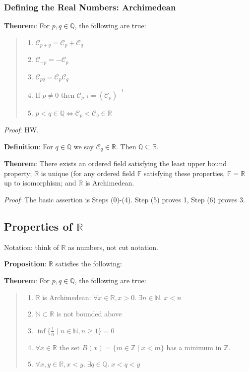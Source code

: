 \documentclass[11pt]{article}
\begin{document}
\subsubsection{Defining the Real Numbers: Archimedean}

\textbf{Theorem}: For $p,q \in \mathbb{Q}$, the following are true:
\begin{quote}\vspace{-0.3cm}
	\begin{enumerate}
	\item $\mathcal{C}_{p+q} = \mathcal{C}_p + \mathcal{C}_q$
	\item $\mathcal{C}_{-p} = -\mathcal{C}_p$
	\item $\mathcal{C}_{pq} = \mathcal{C}_p \mathcal{C}_q$
	\item If $p \neq 0$ then $\mathcal{C}_{p^{-1}} = (\mathcal{C}_p)^{-1}$
	\item $p < q \in \mathbb{Q} \iff \mathcal{C}_p < \mathcal{C}_q \in \mathbb{R}$
	\end{enumerate}
\end{quote}
\emph{Proof}: HW.

\textbf{Definition}: For $q \in \mathbb{Q}$ we say $\mathcal{C}_q \in \mathbb{R}$. Then $\mathbb{Q} \subseteq \mathbb{R}$.

\textbf{Theorem}: There exists an ordered field satisfying the least upper bound property; $\mathbb{R}$ is unique (for any ordered field $\mathbb{F}$ satisfying these properties, $\mathbb{F} = \mathbb{R}$ up to isomorphism; and $\mathbb{R}$ is Archimedean.

\emph{Proof}: The basic assertion is Steps (0)-(4). Step (5) proves 1, Step (6) proves 3.

\subsection{Properties of $\mathbb{R}$}

Notation: think of $\mathbb{R}$ as numbers, not cut notation.

\textbf{Proposition}: $\mathbb{R}$ satisfies the following:

\textbf{Theorem}: For $p,q \in \mathbb{Q}$, the following are true:
\begin{quote}\vspace{-0.3cm}
	\begin{enumerate}
	\item $\mathbb{R}$ is Archimedean: $\forall x \in \mathbb{R}, x > 0.\; \exists n \in \mathbb{N}.\; x < n$
	\item $\mathbb{N} \subset \mathbb{R}$ is not bounded above
	\item $\inf\{\frac{1}{n} \mid n \in \mathbb{N}, n \geq 1\} = 0$
	\item $\forall x \in \mathbb{R}$ the set $B(x) = \{m \in \mathbb{Z} \mid x < m\}$ has a minimum in $\mathbb{Z}$.
	\item $\forall x,y \in \mathbb{R}, x < y.\; \exists q \in \mathbb{Q}.\; x < q < y$
	\end{enumerate}
\end{quote}
\end{document}
